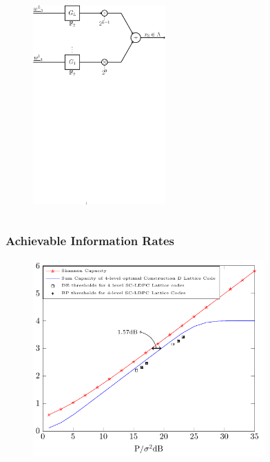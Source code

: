 \documentclass[10pt,presentation]{beamer}
\begin{document}
\begin{frame}
\begin{columns}
\begin{column}{0.47\textwidth}
            \begin{figure}
                \includegraphics[width=2in]{lattice_Constr_D1_user2.pdf}
            \end{figure}
        \end{column}
\end{columns}
\end{frame}


\begin{frame}\frametitle{Achievable Information Rates}
    \begin{figure}
        \begin{center}
            \includegraphics[width=3.5in]{ShapingLoss_Final_CTW.pdf}
        \end{center}
    \end{figure}
\end{frame}
\end{document}
